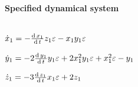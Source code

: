 \(\)
\paragraph{Specified dynamical system}
\(
\)\par
\(\dot x_{1}=-\frac{{\rm d}\,x_{1}}{{\rm d}\,t} z_{1} \varepsilon-x_{1} y_{1} 
\varepsilon
\)\par
\(\dot y_{1}=-2 \frac{{\rm d}\,y_{1}}{{\rm d}\,t} y_{1} \varepsilon+2 x_{1}^{2} y
_{1} \varepsilon+x_{1}^{2} \varepsilon-y_{1}
\)\par
\(\dot z_{1}=-3 \frac{{\rm d}\,z_{1}}{{\rm d}\,t} x_{1} \varepsilon+2 z_{1}
\)\par
